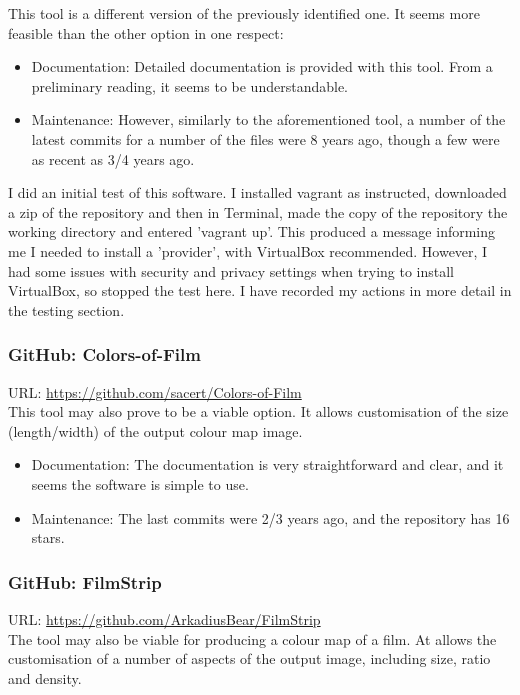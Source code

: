 \documentclass{article}
\begin{document}
This tool is a different version of the previously identified one. It seems more feasible than the other option in one respect:

\begin{itemize}
    \item Documentation: Detailed documentation is provided with this tool. From a preliminary reading, it seems to be understandable.
    \item Maintenance: However, similarly to the aforementioned tool, a number of the latest commits for a number of the files were 8 years ago, though a few were as recent as 3/4 years ago.
\end{itemize}
I did an initial test of this software. I installed vagrant as instructed, downloaded a zip of the repository and then in Terminal, made the copy of the repository the working directory and entered 'vagrant up'. This produced a message informing me I needed to install a 'provider', with VirtualBox recommended. However, I had some issues with security and privacy settings when trying to install VirtualBox, so stopped the test here. I have recorded my actions in more detail in the testing section.

\subsubsection{GitHub: Colors-of-Film}
URL: \url{https://github.com/sacert/Colors-of-Film}\\

This tool may also prove to be a viable option. It allows customisation of the size (length/width) of the output colour map image.
\begin{itemize}
    \item Documentation: The documentation is very straightforward and clear, and it seems the software is simple to use.
    \item Maintenance: The last commits were 2/3 years ago, and the repository has 16 stars.
\end{itemize}

\subsubsection{GitHub: FilmStrip}
URL: \url{https://github.com/ArkadiusBear/FilmStrip}\\

The tool may also be viable for producing a colour map of a film. At allows the customisation of a number of aspects of the output image, including size, ratio and density.
\end{document}
